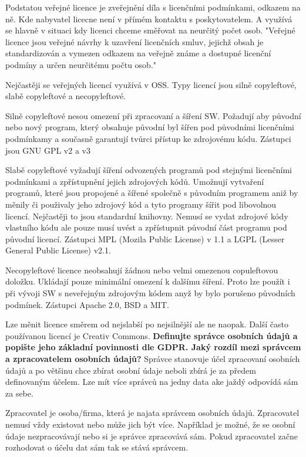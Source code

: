 \documentclass[12pt,a4paper,czech]{report}
\newcommand{\nadpis}[1]{\noindent\textbf{\Large{#1}}\normalsize}
\begin{document}
Podstatou veřejné licence je zveřejnění díla s licenčními podmínkami, odkazem na ně. Kde nabyvatel licecne není v přímém kontaktu s poskytovatelem. A využívá se hlavně v situaci kdy licenci chceme směřovat na neurčitý počet osob.
"Veřejné licence jsou veřejné návrhy k uzavření licenčních smluv, jejichž obsah je standardizován a vymezen odkazem na veřejně známe a dostupné licenční podmíny a určen neurčitému počtu osob."

Nejčastěji se veřejných licencí využívá v OSS. Typy licencí jsou silně copyleftové, slabě copyleftové a necopyleftové.

Silně copyleftové nesou omezení při zpracovaní a šíření SW. Požadují aby původní nebo nový program, který obsahuje původní byl šířen pod původními licenčními podmínkamy a současně garantují tvůrci přístup ke zdrojovému kódu. Zástupci jsou GNU GPL v2 a v3

Slabě copyleftové vyžadují šíření odvozených programů pod stejnými licenčními podmínkami a zpřístupnění jejich zdrojových kódů. Umožnují vytvaření programů, které jsou propojené a šířené společně s původním programem aniž by měnily či použivaly jeho zdrojový kód a tyto programy šířit pod libovolnou licencí. Nejčastěji to jsou standardní knihovny. Nemusí se vydat zdrojové kódy vlastního kódu ale pouze musí uvést a zpřístupnit původní část programu pod původní licencí. Zástupci MPL (Mozila Public License) v 1.1 a  LGPL (Lesser General Public License) v2.1.

Necopyleftové licence neobsahují žádnou nebo velmi omezenou copuleftovou doložku. Ukládají pouze minimální omezení k dalšímu šíření. Proto lze použít i při vývoji SW s neveřejným zdrojovým kódem anyž by bylo porušeno původních podmínek. Zástupci Apache 2.0, BSD a MIT.

Lze měnit licence směrem od nejslabší po nejsilnější ale ne naopak. Další často používanou licencí je Creativ Commons.
\newline
\newline
\nadpis{Definujte správce osobních údajů a popište jeho základní povinnosti dle GDPR. Jaký rozdíl mezi správcem a zpracovatelem osobních údajů?}
\newline
\newline
Správce stanovuje účel zpracovaní osobních údajů a po většinu chce zbírat osobní údaje neboli zbírá je za předem definovaným účelem. Lze mít více správců na jedny data ake jaždý odpovídá sám za sebe.

Zpracovatel je osoba/firma, která je najata správcem osobních údajů. Zpracovatel nemusí vždy existovat nebo může jich být více. Například je možné, že se osobní údaje nezpracovávají nebo si je správce zpracovává sám. Pokud zpracovatel začne rozhodovat o účelu dat sám tak se stává správcem.
\end{document}

